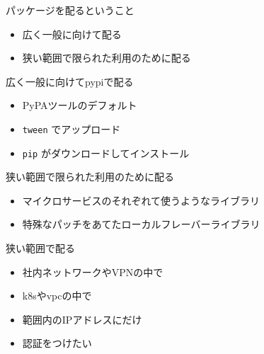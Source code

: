 \documentclass[presentation]{beamer}
\begin{document}
\begin{frame}[label={sec:org39c76d1}]{パッケージを配るということ}
\begin{itemize}
\item 広く一般に向けて配る
\item 狭い範囲で限られた利用のために配る
\end{itemize}
\end{frame}

\begin{frame}[label={sec:org295148c},fragile]{広く一般に向けてpypiで配る}
 \begin{itemize}
\item PyPAツールのデフォルト
\item \texttt{tween} でアップロード
\item \texttt{pip} がダウンロードしてインストール
\end{itemize}
\end{frame}

\begin{frame}[label={sec:org75a1e5c}]{狭い範囲で限られた利用のために配る}
\begin{itemize}
\item マイクロサービスのそれぞれて使うようなライブラリ
\item 特殊なパッチをあてたローカルフレーバーライブラリ
\end{itemize}
\end{frame}

\begin{frame}[label={sec:orgc0e67d7}]{狭い範囲で配る}
\begin{itemize}
\item 社内ネットワークやVPNの中で
\item k8sやvpcの中で
\item 範囲内のIPアドレスにだけ
\item 認証をつけたい
\end{itemize}
\end{frame}
\end{document}
